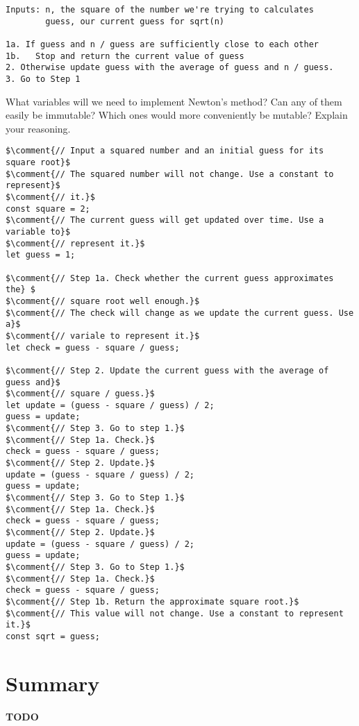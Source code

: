 \begin{lstlisting}[caption={Newton's method for calculating square roots, reprinted for your convenience.}]
Inputs: n, the square of the number we're trying to calculates
        guess, our current guess for sqrt(n)

1a. If guess and n / guess are sufficiently close to each other
1b.   Stop and return the current value of guess
2. Otherwise update guess with the average of guess and n / guess.
3. Go to Step 1
\end{lstlisting}

\begin{question}
  What variables will we need to implement Newton's method? Can any of them easily be immutable? Which ones would more conveniently be mutable? Explain your reasoning.
\end{question}

\begin{lstlisting}[escapeinside=$$]
$\comment{// Input a squared number and an initial guess for its square root}$
$\comment{// The squared number will not change. Use a constant to represent}$
$\comment{// it.}$
const square = 2;
$\comment{// The current guess will get updated over time. Use a variable to}$
$\comment{// represent it.}$
let guess = 1;

$\comment{// Step 1a. Check whether the current guess approximates the} $
$\comment{// square root well enough.}$
$\comment{// The check will change as we update the current guess. Use a}$
$\comment{// variale to represent it.}$
let check = guess - square / guess;

$\comment{// Step 2. Update the current guess with the average of guess and}$
$\comment{// square / guess.}$
let update = (guess - square / guess) / 2;
guess = update;
$\comment{// Step 3. Go to step 1.}$
$\comment{// Step 1a. Check.}$
check = guess - square / guess;
$\comment{// Step 2. Update.}$
update = (guess - square / guess) / 2;
guess = update;
$\comment{// Step 3. Go to Step 1.}$
$\comment{// Step 1a. Check.}$
check = guess - square / guess;
$\comment{// Step 2. Update.}$
update = (guess - square / guess) / 2;
guess = update;
$\comment{// Step 3. Go to Step 1.}$
$\comment{// Step 1a. Check.}$
check = guess - square / guess;
$\comment{// Step 1b. Return the approximate square root.}$
$\comment{// This value will not change. Use a constant to represent it.}$
const sqrt = guess;
\end{lstlisting}

\section{Summary}
\textbf{TODO}
